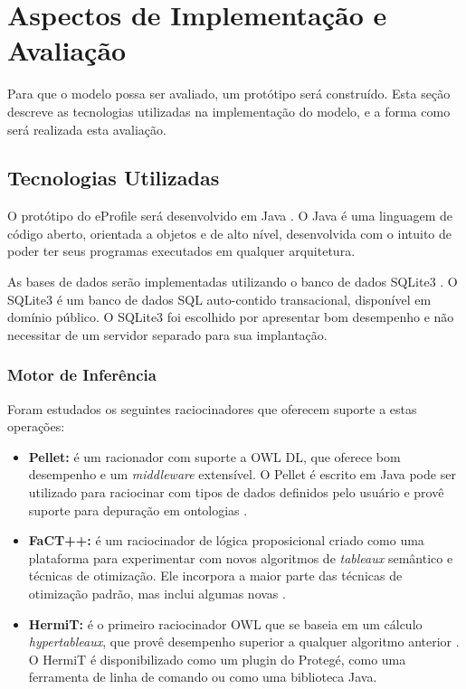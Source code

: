 \chapter{Aspectos de Implementação e Avaliação}
\label{ch:implementacao}

Para que o modelo possa ser avaliado, um protótipo será construído. Esta seção descreve as tecnologias utilizadas na implementação do modelo, e a forma como será realizada esta avaliação.


\section{Tecnologias Utilizadas}
\label{sec:tecnologias}

O protótipo do eProfile será desenvolvido em Java \cite{java}. O Java é uma linguagem de código aberto, orientada a objetos e de alto nível, desenvolvida com o intuito de poder ter seus programas executados em qualquer arquitetura.

As bases de dados serão implementadas utilizando o banco de dados SQLite3 \cite{sqlite3}. O SQLite3 é um banco de dados SQL auto-contido transacional, disponível em domínio público. O SQLite3 foi escolhido por apresentar bom desempenho e não necessitar de um servidor separado para sua implantação.


\subsection{Motor de Inferência}
\label{sec:motor_inferencia}

Foram estudados os seguintes raciocinadores que oferecem suporte a estas operações:

\begin{itemize}

\item {\bf Pellet:} é um racionador com suporte a OWL DL, que oferece bom desempenho e um \emph{middleware} extensível. O Pellet é escrito em Java pode ser utilizado para raciocinar com tipos de dados definidos pelo usuário e provê suporte para depuração em ontologias \cite{sirin05}.

\item {\bf FaCT++:} é um raciocinador de lógica proposicional criado como uma plataforma para experimentar com novos algoritmos de \emph{tableaux} semântico e técnicas de otimização. Ele incorpora a maior parte das técnicas de otimização padrão, mas inclui algumas novas \cite{tsarkov06}.

\item {\bf HermiT:} é o primeiro raciocinador OWL que se baseia em um cálculo \emph{hypertableaux}, que provê desempenho superior a qualquer algoritmo anterior \cite{motik09}. O HermiT é disponibilizado como um plugin do Protegé, como uma ferramenta de linha de comando ou como uma biblioteca Java.

\end{itemize}

